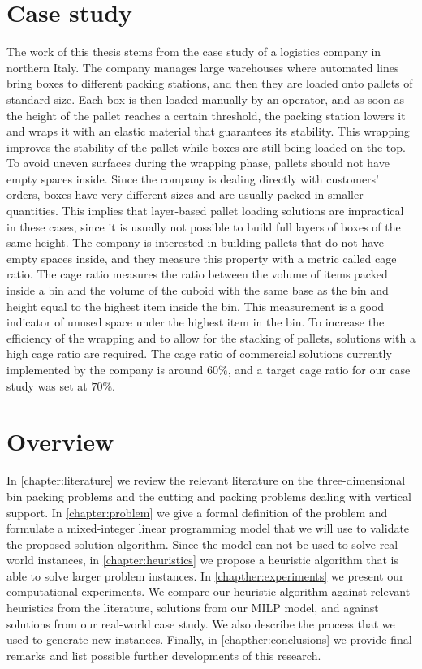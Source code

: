 \section{Case study}
\label{sec:intro:case_study}%
The work of this thesis stems from the case study of a logistics company in northern Italy.
The company manages large warehouses where automated lines bring boxes to different packing stations, and then they are loaded onto pallets of standard size.
Each box is then loaded manually by an operator, and as soon as the height of the pallet reaches a certain threshold, the packing station lowers it and wraps it with an elastic material that guarantees its stability.
This wrapping improves the stability of the pallet while boxes are still being loaded on the top. To avoid uneven surfaces during the wrapping phase, pallets should not have empty spaces inside.
Since the company is dealing directly with customers' orders, boxes have very different sizes and are usually packed in smaller quantities. This implies that layer-based pallet loading solutions are impractical in these cases, since it is usually not possible to build full layers of boxes of the same height.
The company is interested in building pallets that do not have empty spaces inside, and they measure this property with a metric called cage ratio.
The cage ratio measures the ratio between the volume of items packed inside a bin and the volume of the cuboid with the same base as the bin and height equal to the highest item inside the bin.
This measurement is a good indicator of unused space under the highest item in the bin.
To increase the efficiency of the wrapping and to allow for the stacking of pallets, solutions with a high cage ratio are required.
The cage ratio of commercial solutions currently implemented by the company is around $60\%$, and a target cage ratio for our case study was set at $70\%$.

\section{Overview}
\label{sec:intro:overview}%
In \cref{chapter:literature} we review the relevant literature on the three-dimensional bin packing problems and the cutting and packing problems dealing with vertical support.
In \cref{chapter:problem} we give a formal definition of the problem and formulate a mixed-integer linear programming model that we will use to validate the proposed solution algorithm.
Since the model can not be used to solve real-world instances, in \cref{chapter:heuristics} we propose a heuristic algorithm that is able to solve larger problem instances.
In \cref{chapther:experiments} we present our computational experiments. We compare our heuristic algorithm against relevant heuristics from the literature, solutions from our MILP model, and against solutions from our real-world case study. We also describe the process that we used to generate new instances.
Finally, in \cref{chapther:conclusions} we provide final remarks and list possible further developments of this research.